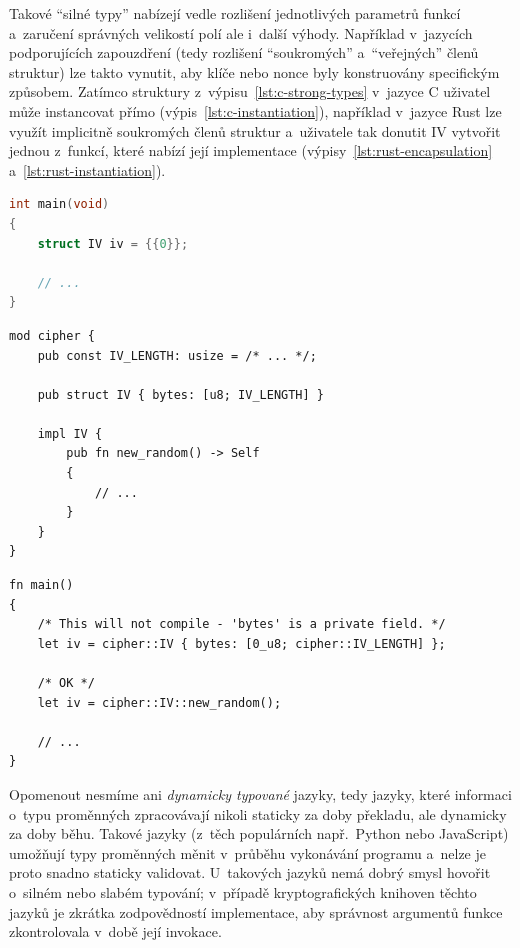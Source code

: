 Takové ``silné typy'' nabízejí vedle rozlišení jednotlivých parametrů funkcí a~zaručení správ\-ných velikostí polí ale i~další výhody.  Například v~jazycích podporujících zapouzdření (tedy rozlišení ``soukromých'' a~``veřejných'' členů struktur) lze takto vynutit, aby klíče nebo nonce byly konstruovány specifickým způsobem. Zatímco struktury z~výpisu~\ref{lst:c-strong-types} v~jazyce C uživatel může instancovat přímo (výpis~\ref{lst:c-instantiation}), například v~jazyce Rust lze využít implicitně soukromých členů struktur a~uživatele tak donutit IV vytvořit jednou z~funkcí, které nabízí její implementace (výpisy~\ref{lst:rust-encapsulation} a~\ref{lst:rust-instantiation}).

\begin{lstlisting}[caption={~Přímá inicializace struktury IV v~jazyce C},label={lst:c-instantiation},float,language=C]
int main(void)
{
    struct IV iv = {{0}};
    
    // ...
}
\end{lstlisting}

\begin{lstlisting}[caption={~Možné zapouzdření IV v~jazyce Rust},label={lst:rust-encapsulation},float]
mod cipher {
    pub const IV_LENGTH: usize = /* ... */;

    pub struct IV { bytes: [u8; IV_LENGTH] }

    impl IV {
        pub fn new_random() -> Self
        {
            // ...
        }
    }
}
\end{lstlisting}

\begin{lstlisting}[caption={~Nemožnost přímé inicializace zapouzdřeného IV v~jazyce Rust},label={lst:rust-instantiation},float]
fn main()
{
    /* This will not compile - 'bytes' is a private field. */
    let iv = cipher::IV { bytes: [0_u8; cipher::IV_LENGTH] };

    /* OK */
    let iv = cipher::IV::new_random();

    // ...
}
\end{lstlisting}

Opomenout nesmíme ani \emph{dynamicky typované} jazyky, tedy jazyky, které informaci o~typu proměnných zpracovávají nikoli staticky za doby překladu, ale dynamicky za doby běhu. Takové jazyky (z~těch populárních např.\ Python nebo JavaScript) umožňují typy proměnných měnit v~průběhu vykonávání programu a~nelze je proto snadno staticky validovat. U~takových jazyků nemá dobrý smysl hovořit o~silném nebo slabém typování; v~případě kryptografických knihoven těchto jazyků je zkrátka zodpovědností implementace, aby správnost argumentů funkce zkontrolovala v~době její invokace.

